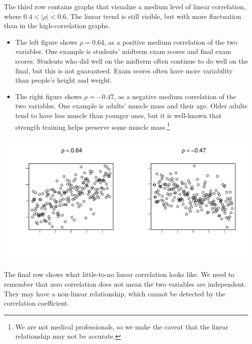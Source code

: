 \documentclass[
]{article}
\begin{document}
The third row contains graphs that visualize a medium level of linear
correlation, where \(0.4 < |\rho| < 0.6\). The linear trend is still
visible, but with more fluctuation than in the high-correlation graphs.

\begin{itemize}
\item
  The left figure shows \(\rho = 0.64\), as a positive medium
  correlation of the two variables. One example is students' midterm
  exam scores and final exam scores. Students who did well on the
  midterm often continue to do well on the final, but this is not
  guaranteed. Exam scores often have more variability than people's
  height and weight.
\item
  The right figure shows \(\rho = -0.47\), as a negative medium
  correlation of the two variables. One example is adults' muscle mass
  and their age. Older adults tend to have less muscle than younger
  ones, but it is well-known that strength training helps preserve some
  muscle mass.\footnote{We are not medical professionals, so we make the
    caveat that the linear relationship may not be accurate.}
\end{itemize}

\includegraphics{PTT_Analysis_of_Test_Scores_Unfinished_files/figure-latex/mid-correlation-1.pdf}

The final row shows what little-to-no linear correlation looks like. We
need to remember that zero correlation does not mean the two variables
are independent. They may have a non-linear relationship, which cannot
be detected by the correlation coefficient.
\end{document}
